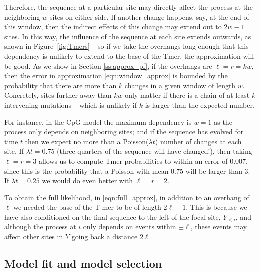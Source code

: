 \documentclass{article}
\theoremstyle{plain}
\theoremstyle{definition}
\begin{document}
Therefore, the sequence at a particular site may directly affect the process at the neighboring $w$ sites on either side.
If another change happens, say, at the end of this window,
then the indirect effects of this change may extend out to $2w-1$ sites.
In this way, the influence of the sequence at each site extends outwards, as shown in Figure~\ref{fig:Tmers} --
so if we take the overhangs long enough that this dependency is unlikely to extend to the base of the Tmer,
the approximation will be good.
As we show in Section \ref{ss:approx_pf}, if the overhangs are $\ell = r = kw$,
then the error in approximation \eqref{eqn:window_approx}
is bounded by the probability that there are more than $k$ changes in a given window of length $w$.
Concretely, sites further away than $kw$ only matter if there is a chain of at least $k$ intervening mutations
-- which is unlikely if $k$ is larger than the expected number.

For instance, in the CpG model the maximum dependency is $w=1$ as the process only depends on neighboring sites;
and if the sequence has evolved for time $t$ then we expect no more than a Poisson($\lambda t$) number of changes at each site.
If $\lambda t = 0.75$ (three-quarters of the sequence will have changed!),
then taking $\ell = r = 3$ allows us to compute Tmer probabilities to within an error of 0.007,
since this is the probability that a Poisson with mean 0.75 will be larger than 3.
If $\lambda t = 0.25$ we would do even better with $\ell = r = 2$.

To obtain the full likelihood, in \eqref{eqn:full_approx}, in addition to an overhang of $\ell$
we needed the base of the T-mer to be of length $2\ell+1$.
This is because we have also conditioned on the final sequence to the left of the focal site, $Y_{<i}$,
and although the process at $i$ only depends on events within $\pm \ell$,
these events may affect other sites in $Y$ going back a distance $2\ell$.


\subsection{Model fit and model selection}
\end{document}
